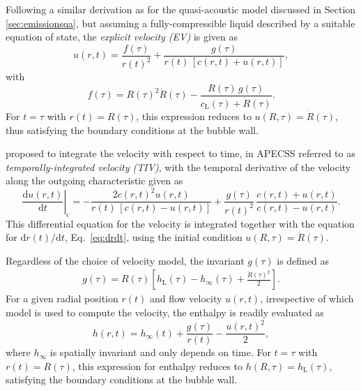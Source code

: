 Following a similar derivation as for the quasi-acoustic model discussed in Section \ref{sec:emissionsqa}, but assuming a fully-compressible liquid described by a suitable equation of state, the {\it explicit velocity (EV)} is given as
\begin{equation}
    u(r,t) = \frac{f(\tau)}{r(t)^2} + \frac{g(\tau)}{r(t) \, [c(r,t) + u(r,t)]} , \label{eq:u_rt}
\end{equation}
with 
\begin{equation}
    f(\tau) = R(\tau)^2 \dot{R}(\tau) - \frac{R(\tau) \, g(\tau)}{c_\mathrm{L}(\tau) + \dot{R}(\tau)}  . \label{eq:f_R}
\end{equation}
For $t=\tau$ with $r(t)=R(\tau)$, this expression reduces to $u(R,\tau)=\dot{R}(\tau)$, thus satisfying the boundary conditions at the bubble wall.

\citet{Hickling1963} proposed to integrate the velocity with respect to time, in APECSS referred to as {\it temporally-integrated velocity (TIV)}, with the temporal derivative of the velocity along the outgoing characteristic given as
\begin{equation}
    \left. \frac{\mathrm{d}u(r,t)}{\mathrm{d}t} \right|_\text{c} =  - \frac{2 c(r,t)^2 u(r,t)}{r(t) \, [c(r,t)-u(r,t)]} + \frac{g(\tau)}{r(t)^2} \, \frac{c(r,t)+u(r,t)}{c(r,t)-u(r,t)}. \label{eq:dudt_rt}
\end{equation}
This differential equation for the velocity is integrated together with the equation for ${\mathrm{d}r(t)/\mathrm{d}t}$, Eq.~\eqref{eq:drdt}, using the initial condition $u(R,\tau) = \dot{R}(\tau)$. 

Regardless of the choice of velocity model, the invariant $g(\tau)$ is defined as
\begin{align}
    g(\tau) = R(\tau) \left[h_\mathrm{L}(\tau) - h_\infty(\tau) + \frac{\dot{R}(\tau)^2}{2} \right]
    \label{eq:g_R} .
\end{align}
For a given radial position $r(t)$ and flow velocity $u(r,t)$, irrespective of which model is used to compute the velocity, the enthalpy is readily evaluated as
\begin{equation}
    h(r,t) = h_\infty(t) + \frac{g(\tau)}{r(t)} - \frac{u(r,t)^2}{2}, \label{eq:h_rt}
\end{equation}
where $h_\infty$ is spatially invariant and only depends on time. For $t=\tau$ with $r(t)=R(\tau)$, this expression for enthalpy reduces to $h(R,\tau)=h_\mathrm{L}(\tau)$, satisfying the boundary conditions at the bubble wall. 

